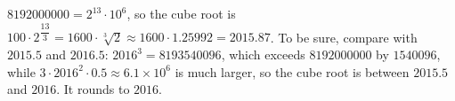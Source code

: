 $8192000000=2^{13}\cdot10^6$, so the cube root is $100\cdot2^{\dfrac{13}{3}}=1600\cdot\sqrt[3]2\approx1600\cdot1.25992=2015.87$. To be sure, compare with $2015.5$ and $2016.5$: $2016^3=8193540096$, which exceeds $8192000000$ by $1540096$, while $3\cdot2016^2\cdot0.5\approx6.1\times10^6$ is much larger, so the cube root is between $2015.5$ and $2016$. It rounds to $\boxed{2016}$.
